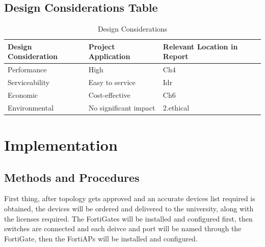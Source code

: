 \documentclass[12pt]{report}
\begin{document}
\section{Design Considerations Table}
\begin{table}[h]
    \centering
    \begin{tabular}{|>{\centering\arraybackslash}m{5cm}|>{\centering\arraybackslash}m{5cm}|>{\centering\arraybackslash}m{5cm}|}
        \hline
        \textbf{Design Consideration} & \textbf{Project Application} & \textbf{Relevant Location in Report} \\
        \hline
        Performance & High & Ch4 \\
        \hline
        Serviceability & Easy to service & Idr \\
        \hline
        Economic & Cost-effective & Ch6 \\
        \hline
        Environmental & No significant impact & 2.ethical \\
        \hline
    \end{tabular}
    \caption{Design Considerations}
    \label{tab:design_considerations}
\end{table}


\chapter{Implementation}
\section{Methods and Procedures}
First thing, after topology gets approved and an accurate devices list required is obtained, the devices will be ordered and delivered to the university, along with the licenses required. The FortiGates will be installed and configured first, then switches are connected and each deivce and port will be named through the FortiGate, then the FortiAPs will be installed and configured.
\end{document}
